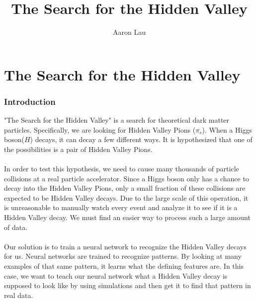 \documentclass[10pt,a4paper]{report}
\author{Aaron Lau}
\title{The Search for the Hidden Valley}
\begin{document}
\part*{The Search for the Hidden Valley}
\section*{Introduction}

"The Search for the Hidden Valley" is a search for theoretical dark matter particles. Specifically, we are looking for Hidden Valley Pions ($\pi_s$). When a Higgs boson($H$) decays, it can decay a few different ways. It is hypothesized that one of the possibilities is a pair of Hidden Valley Pions.\\\\
In order to test this hypothesis, we need to cause many thousands of particle collisions at a real particle accelerator. Since a Higgs boson only has a chance to decay into the Hidden Valley Pions, only a small fraction of  these collisions are expected to be Hidden Valley decays. Due to the large scale of this operation, it is unreasonable to manually watch every event and analyze it to see if it is a Hidden Valley decay. We must find an easier way to process such a large amount of data.\\\\
Our solution is to train a neural network to recognize the Hidden Valley decays for us. Neural networks are trained to recognize patterns. By looking at many examples of that same pattern, it learns what the defining features are. In this case, we want to teach our neural network what a Hidden Valley decay is supposed to look like by using simulations and then get it to find that pattern in real data.
\end{document}
